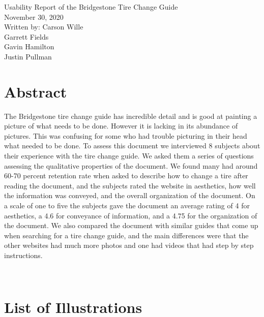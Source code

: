 \documentclass[12pt,A4paper]{article}
\begin{document}
	\thispagestyle{empty}
	\begin{center}
		\Huge
		Usability Report of the Bridgestone Tire Change Guide \\
		\vspace{0.25 in}
		\Large
		 November 30, 2020 \\
		 \vspace{0.25 in}
		Written by: Carson Wille \\ \hspace{1.25 in} Garrett Fields \\ \hspace{1.4 in} Gavin Hamilton \\ \hspace{1.33 in} Justin Pullman
		
	\end{center}
	\clearpage
	\setcounter{page}{2}
	\section{Abstract}
	The Bridgestone tire change guide has incredible detail and is good at painting a picture of what needs to be done. However it is lacking in its abundance of pictures. This was confusing for some who had trouble picturing in their head what needed to be done. To assess this document we interviewed 8 subjects about their experience with the tire change guide. We asked them a series of questions assessing the qualitative properties of the document. We found many had around 60-70 percent retention rate when asked to describe how to change a tire after reading the document, and the subjects rated the website in aesthetics, how well the information was conveyed, and the overall organization of the document. On a scale of one to five the subjects gave the document an average rating of 4 for aesthetics, a 4.6 for conveyance of information, and a 4.75 for the organization of the document. We also compared the document with similar guides that come up when searching for a tire change guide, and the main differences were that the other websites had much more photos and one had videos that had step by step instructions.
	
	\\

	\tableofcontents
	\clearpage

	\section{List of Illustrations}
\end{document}

